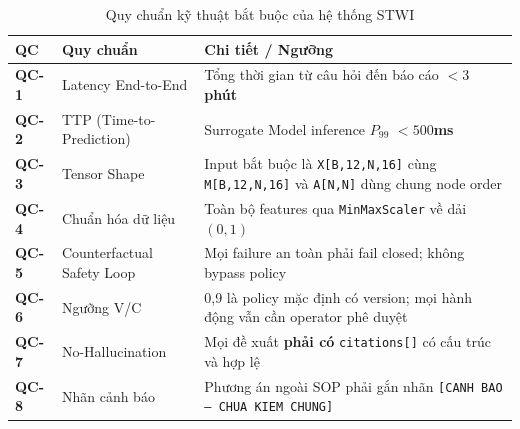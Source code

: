 \begin{table}[H]
\centering
\caption{Quy chuẩn kỹ thuật bắt buộc của hệ thống STWI}
\label{tab:constraints}
\renewcommand{\arraystretch}{1.5}
\begin{tabular}{>{\bfseries}p{1cm} p{4.5cm} p{6cm}}
\toprule
\textbf{QC} & \textbf{Quy chuẩn} & \textbf{Chi tiết / Ngưỡng} \\
\midrule
QC-1 & Latency End-to-End & Tổng thời gian từ câu hỏi đến báo cáo \textbf{$< 3$ phút} \\
\rowcolor{rowgray}
QC-2 & TTP (Time-to-Prediction) & Surrogate Model inference $P_{99}$ \textbf{$< 500$ms} \\
QC-3 & Tensor Shape & Input bắt buộc là \texttt{X[B,12,N,16]} cùng \texttt{M[B,12,N,16]} và \texttt{A[N,N]} dùng chung node order \\
\rowcolor{rowgray}
QC-4 & Chuẩn hóa dữ liệu & Toàn bộ features qua \texttt{MinMaxScaler} về dải \textbf{$(0, 1)$} \\
QC-5 & Counterfactual Safety Loop & Mọi failure an toàn phải fail closed; không bypass policy \\
\rowcolor{rowgray}
QC-6 & Ngưỡng V/C & 0,9 là policy mặc định có version; mọi hành động vẫn cần operator phê duyệt \\
QC-7 & No-Hallucination & Mọi đề xuất \textbf{phải có} \texttt{citations[]} có cấu trúc và hợp lệ \\
\rowcolor{rowgray}
QC-8 & Nhãn cảnh báo & Phương án ngoài SOP phải gắn nhãn \texttt{[CANH BAO -- CHUA KIEM CHUNG]} \\
\bottomrule
\end{tabular}
\end{table}
